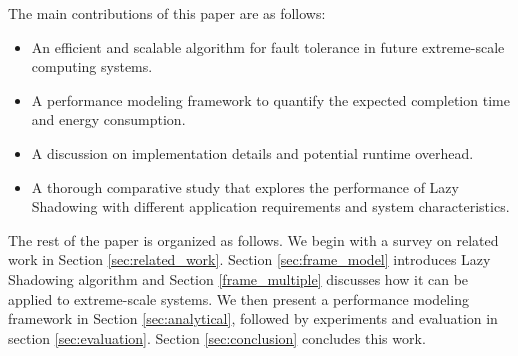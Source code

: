 The main contributions of this paper are as follows:
\begin{itemize}
	\item An efficient and scalable algorithm for fault tolerance in future extreme-scale computing systems.
    \item A performance modeling framework to quantify the expected completion time and energy consumption.
    \item A discussion on implementation details and potential runtime overhead.
	\item A thorough comparative study that explores the performance of Lazy Shadowing with different application requirements and system characteristics.
\end{itemize}


The rest of the paper is organized as follows. We begin with a survey on related work in Section 
\ref{sec:related_work}. Section \ref{sec:frame_model} introduces Lazy Shadowing algorithm and Section \ref{frame_multiple} discusses how it can be applied to 
extreme-scale systems. 
We then present a performance modeling framework
in Section \ref{sec:analytical}, 
followed by experiments and evaluation in
section \ref{sec:evaluation}. Section \ref{sec:conclusion} concludes this work.%
